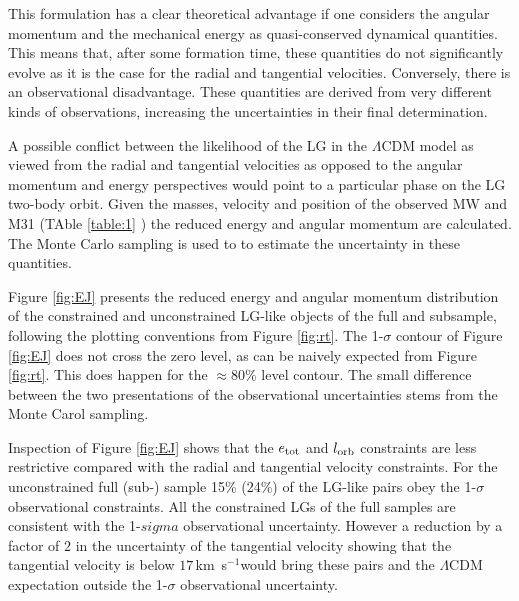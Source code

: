 \documentclass{emulateapj}
\newcommand{\kms}{\,km~s$^{-1}$}
\begin{document}
This formulation has a clear theoretical advantage if one considers the angular momentum and the mechanical energy as quasi-conserved dynamical quantities. This means that, after some formation time, these quantities do not significantly evolve as it is the case for the radial and tangential velocities. 
Conversely, there is an observational disadvantage. These quantities are derived from very different kinds of observations, increasing the uncertainties in their final determination.

A possible conflict between the likelihood of the LG in the $\Lambda$CDM model as viewed from the radial and tangential velocities as opposed to the angular momentum and energy perspectives would point to a particular phase on the LG two-body orbit. Given the masses, velocity and position of the observed MW and M31 (TAble \ref{table:1} ) the reduced energy and angular momentum are calculated. The Monte Carlo sampling is used to to estimate the uncertainty in these quantities. %


Figure \ref{fig:EJ} presents the reduced  energy and angular momentum distribution of the constrained and unconstrained LG-like  objects of the full and subsample, following the   plotting conventions from Figure \ref{fig:rt}.  The  1-$\sigma$ contour of Figure \ref{fig:EJ} does not cross the zero level, as can be naively expected from Figure \ref{fig:rt}. This does happen for the $\approx 80\%$ level contour. The small difference between the two presentations of the observational uncertainties stems from the Monte Carol sampling. 

Inspection of Figure \ref{fig:EJ}  shows that the $e_{\rm tot}$  and $l_{\rm orb}$ constraints are less restrictive compared with the radial and tangential velocity constraints. For the unconstrained full (sub-) sample 15\% (24\%)  of the LG-like pairs obey the 1-$\sigma$ observational constraints. All the constrained LGs of the full 
samples are consistent with the 1-$sigma$ observational uncertainty.
However a reduction by a factor of $2$ in the uncertainty of the tangential velocity showing that the tangential velocity is below $17$\kms would 
bring these pairs and the $\Lambda$CDM expectation outside the 1-$\sigma$ observational uncertainty.
\end{document}
